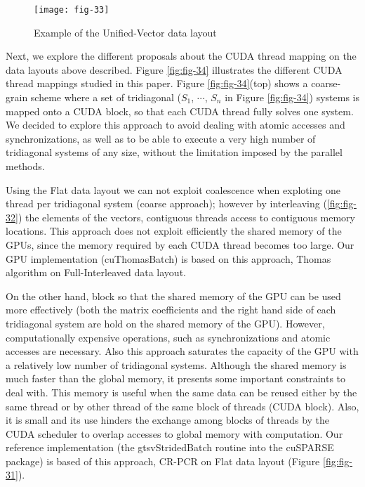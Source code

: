 \begin{figure}[htbp]
    \centering
    \texttt{[image: fig-33]}
    \caption{Example of the Unified-Vector data layout}
    \label{fig:fig-33}
\end{figure}

Next, we explore the different proposals about the CUDA thread mapping on the
data layouts above described. Figure \ref{fig:fig-34} illustrates the different CUDA thread mappings studied in this paper. Figure \ref{fig:fig-34}(top) shows a coarse-grain scheme where a set of
tridiagonal ($S_1$, $\cdots$, $S_n$ in Figure \ref{fig:fig-34}) systems
 is mapped onto a CUDA block, so that each CUDA thread fully solves one system. We decided to explore this approach to avoid
 dealing with atomic accesses and synchronizations, as well as to be able to execute a
 very high number of tridiagonal systems of any size, without the limitation imposed by
 the parallel methods.

 Using the Flat data layout we can not exploit coalescence when exploting one thread per tridiagonal
 system (coarse approach); however by interleaving (\ref{fig:fig-32}) the elements of the 
 vectors, contiguous threads access to contiguous memory locations. This approach does not
 exploit efficiently the shared memory of the GPUs, since the memory required by each
 CUDA thread becomes too large. Our GPU implementation (cuThomasBatch) is based on this approach,
 Thomas algorithm on Full-Interleaved data layout.

 On the other hand, block so that the shared memory of the GPU can be used more effectively (both the
 matrix coefficients and the right hand side of each tridiagonal system are hold on the
 shared memory of the GPU). However, computationally expensive operations, such as
 synchronizations and atomic accesses are necessary. Also this approach saturates the
 capacity of the GPU with a relatively low number of tridiagonal systems. Although the
 shared memory is much faster than the global memory, it presents some important 
 constraints to deal with. This memory is useful when the same data can be reused either by
 the same thread or by other thread of the same block of threads (CUDA block). Also,
 it is small and its use hinders the exchange
 among blocks of threads by the CUDA scheduler to overlap accesses to global memory
 with computation. Our reference implementation (the gtsvStridedBatch routine into
 the cuSPARSE package) is based of this approach, CR-PCR on Flat
 data layout (Figure \ref{fig:fig-31}).

